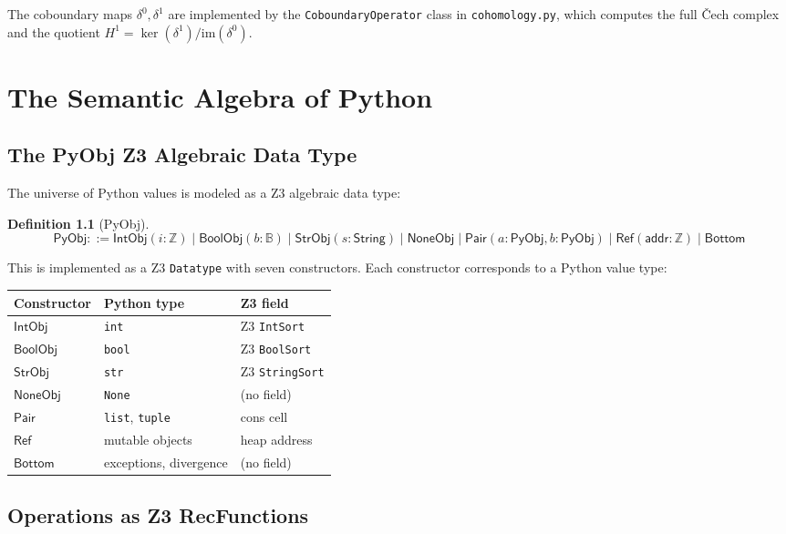\documentclass[11pt,a4paper]{report}
\theoremstyle{definition}
\newtheorem{definition}{Definition}[chapter]
\theoremstyle{plain}
\newcommand{\Int}{\mathbb{Z}}
\newcommand{\Bool}{\mathbb{B}}
\newcommand{\PyObj}{\mathsf{PyObj}}
\newcommand{\Hone}{H^1}
\begin{document}
The coboundary maps $\delta^0, \delta^1$ are implemented by the
\texttt{CoboundaryOperator} class in \texttt{cohomology.py}, which
computes the full \v{C}ech complex and the quotient $\Hone =
\ker(\delta^1) / \mathrm{im}(\delta^0)$.


\chapter{The Semantic Algebra of Python}
\label{ch:pytheory}

\section{The PyObj Z3 Algebraic Data Type}

The universe of Python values is modeled as a Z3 algebraic data type:

\begin{definition}[PyObj]
\[
\PyObj ::=
  \mathsf{IntObj}(i : \Int) \mid
  \mathsf{BoolObj}(b : \Bool) \mid
  \mathsf{StrObj}(s : \mathsf{String}) \mid
  \mathsf{NoneObj} \mid
  \mathsf{Pair}(a : \PyObj, b : \PyObj) \mid
  \mathsf{Ref}(\mathsf{addr} : \Int) \mid
  \mathsf{Bottom}
\]
\end{definition}

This is implemented as a Z3 \texttt{Datatype} with seven constructors.
Each constructor corresponds to a Python value type:

\begin{center}
\begin{tabular}{l l l}
  \textbf{Constructor} & \textbf{Python type} & \textbf{Z3 field} \\
  \hline
  $\mathsf{IntObj}$ & \texttt{int} & Z3 \texttt{IntSort} \\
  $\mathsf{BoolObj}$ & \texttt{bool} & Z3 \texttt{BoolSort} \\
  $\mathsf{StrObj}$ & \texttt{str} & Z3 \texttt{StringSort} \\
  $\mathsf{NoneObj}$ & \texttt{None} & (no field) \\
  $\mathsf{Pair}$ & \texttt{list}, \texttt{tuple} & cons cell \\
  $\mathsf{Ref}$ & mutable objects & heap address \\
  $\mathsf{Bottom}$ & exceptions, divergence & (no field) \\
\end{tabular}
\end{center}

\section{Operations as Z3 RecFunctions}
\end{document}
